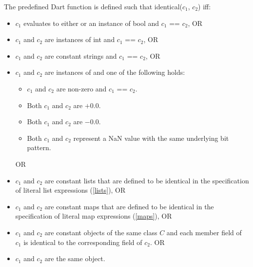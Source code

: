 \documentclass{article}
\newcommand{\code}[1]{{\sf #1}}
\begin{document}
\LMHash{}
The predefined Dart function  is defined such that \code{identical($c_1$, $c_2$)} iff:
 \begin{itemize}
 \item $c_1$  evaluates to either \NULL{} or  an instance of \code{bool} and \code{$c_1$ == $c_2$}, OR
 \item $c_1$ and $c_2$ are instances of \code{int} and \code{$c_1$ == $c_2$}, OR
 \item $c_1$ and $c_2$ are constant strings and \code{$c_1$ == $c_2$}, OR
 \item $c_1$  and $c_2$  are instances of  and  one of the following holds:
 \begin{itemize}
   \item $c_1$ and $c_2$ are non-zero and \code{$c_1$ == $c_2$}.
   \item  Both $c_1$ and $c_2$ are $+0.0$.
   \item Both  $c_1$ and $c_2$ are $-0.0$.
   \item Both $c_1$ and $c_2$ represent a NaN value with the same underlying bit pattern.
 \end{itemize}
 OR
 \item $c_1$ and $c_2$ are constant lists that are defined to be identical in the specification of literal list expressions (\ref{lists}), OR
 \item $c_1$ and $c_2$ are constant maps that are defined to be identical in the specification of literal map expressions (\ref{maps}), OR
 \item $c_1$ and $c_2$ are constant objects of the same class $C$ and each member field of $c_1$ is identical to the corresponding field of $c_2$. OR
\item $c_1$ and $c_2$ are the same object.
\end{itemize}
    

    
\end{document}
